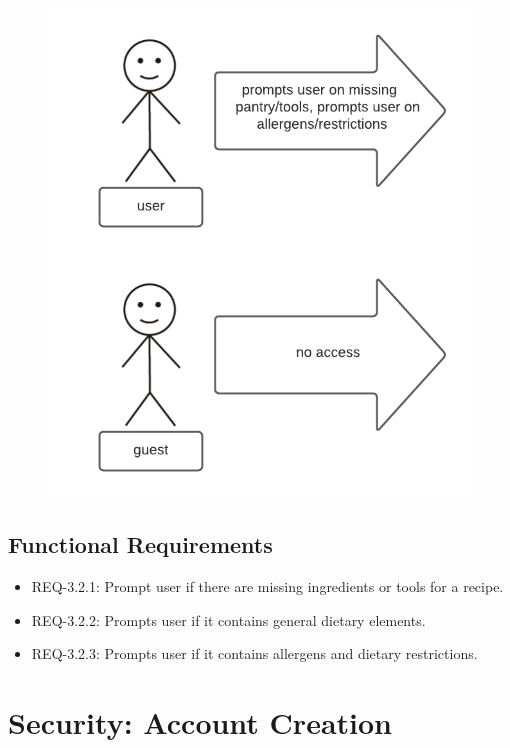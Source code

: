 \documentclass{scrreprt}
\begin{document}
\begin{figure}[H]\centering
    \includegraphics[width=\columnwidth]{response diagrams/Flag.png}
\end{figure}

\subsection{\gls{Functional Requirements}}

\begin{itemize}
    \item REQ-3.2.1: Prompt user if there are missing ingredients or tools for a recipe.
    \item REQ-3.2.2: Prompts user if it contains general dietary elements.
    \item REQ-3.2.3: Prompts user if it contains allergens and dietary restrictions.
\end{itemize}

\section{Security: Account Creation}
\end{document}
